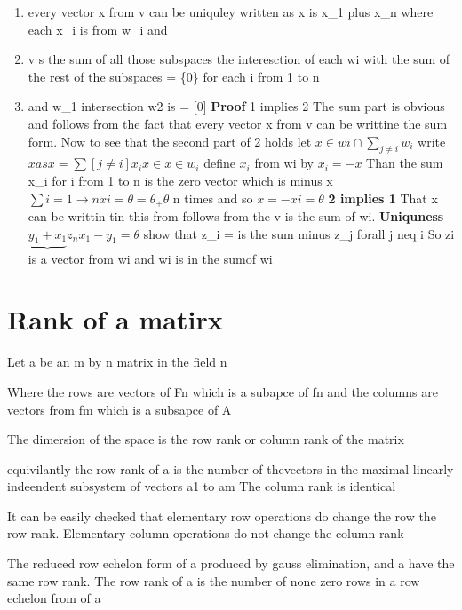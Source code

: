 \documentclass[twocolumn]{article}
\providecommand{\tightlist}{%
  \setlength{\itemsep}{0pt}\setlength{\parskip}{0pt}}
\begin{document}
\begin{itemize}
  \begin{enumerate}
  \def\labelenumi{\arabic{enumi})}
  \tightlist
  \item
    every vector x from v can be uniquley written as x is x\_1 plus x\_n
    where each x\_i is from w\_i and
  \item
    v s the sum of all those subspaces the interesction of each wi with
    the sum of the rest of the subspaces = \{0\} for each i from 1 to n
  \item
    and w\_1 intersection w2 is = {[}0{]} \textbf{Proof} 1 implies 2 The
    sum part is obvious and follows from the fact that every vector x
    from v can be writtine the sum form. Now to see that the second part
    of 2 holds let \(x \in wi \cap \sum _{j \neq i }w_i\) write
    \(x as x = \sum[j \neq i] x_i x\in x \in w_i\) define \(x_i\) from
    wi by \(x_i = -x\) Than the sum x\_i for i from 1 to n is the zero
    vector which is minus x
    \(\sum i=1 \to n xi = \theta = \theta_ + \theta\) n times and so
    \(x = -xi = \theta\) \textbf{2 implies 1} That x can be writtin tin
    this from follows from the v is the sum of wi. \textbf{Uniquness}
    \(\underbrace{y_1 + x_1}{z_n} x_1 - y_1 = \theta\) show that z\_i =
    is the sum minus z\_j forall j neq i So zi is a vector from wi and
    wi is in the sumof wi
  \end{enumerate}
\end{itemize}

\hypertarget{rank-of-a-matirx}{%
\section{Rank of a matirx}\label{rank-of-a-matirx}}

Let a be an m by n matrix in the field n

Where the rows are vectors of Fn which is a subapce of fn and the
columns are vectors from fm which is a subsapce of A

The dimersion of the space is the row rank or column rank of the matrix

equivilantly the row rank of a is the number of thevectors in the
maximal linearly indeendent subsystem of vectors a1 to am The column
rank is identical

It can be easily checked that elementary row operations do change the
row the row rank. Elementary column operations do not change the column
rank

The reduced row echelon form of a produced by gauss elimination, and a
have the same row rank. The row rank of a is the number of none zero
rows in a row echelon from of a
\end{document}

